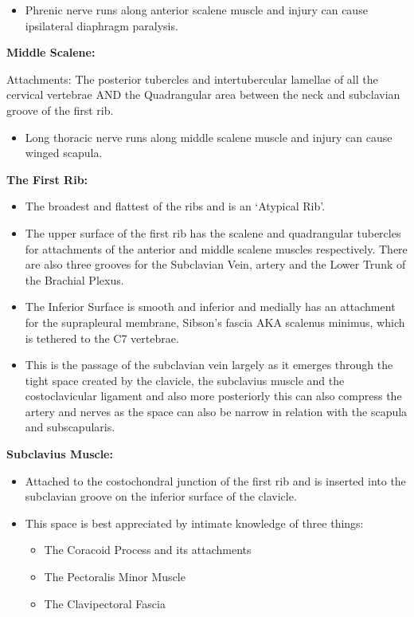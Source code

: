 \documentclass[
]{book}
\providecommand{\tightlist}{%
  \setlength{\itemsep}{0pt}\setlength{\parskip}{0pt}}
\begin{document}
\begin{itemize}
\tightlist
\item
  Phrenic nerve runs along anterior scalene muscle and injury can
  cause ipsilateral diaphragm paralysis.
\end{itemize}

\textbf{Middle Scalene:}

Attachments: The posterior tubercles and intertubercular lamellae of all
the cervical vertebrae AND the Quadrangular area between the neck and
subclavian groove of the first rib. \citep{mcminnLastAnatomyRegional2019}

\begin{itemize}
\tightlist
\item
  Long thoracic nerve runs along middle scalene muscle and injury can
  cause winged scapula.
\end{itemize}

\textbf{The First Rib:}~

\begin{itemize}
\item
  The broadest and flattest of the ribs and is an `Atypical Rib'.~
\item
  The upper surface of the first rib has the scalene and quadrangular
  tubercles for attachments of the anterior and middle scalene muscles
  respectively. There are also three grooves for the Subclavian Vein,
  artery and the Lower Trunk of the Brachial Plexus.~
\item
  The Inferior Surface is smooth and inferior and medially has an
  attachment for the suprapleural membrane, Sibson's fascia AKA
  scalenus minimus, which is tethered to the C7 vertebrae.~
\item
  This is the passage of the subclavian vein largely as it emerges
  through the tight space created by the clavicle, the subclavius
  muscle and the costoclavicular ligament and also more posteriorly
  this can also compress the artery and nerves as the space can also
  be narrow in relation with the scapula and subscapularis.
  \citep{garygwindAnatomicExposuresVascular2013}
\end{itemize}

\textbf{Subclavius Muscle:}

\begin{itemize}
\item
  Attached to the costochondral junction of the first rib and is
  inserted into the subclavian groove on the inferior surface of the
  clavicle. \citep{mcminnLastAnatomyRegional2019}
\item
  This space is best appreciated by intimate knowledge of three
  things:

  \begin{itemize}
  \item
    The Coracoid Process and its attachments
  \item
    The Pectoralis Minor Muscle
  \item
    The Clavipectoral Fascia
  \end{itemize}
\end{itemize}
\end{document}
